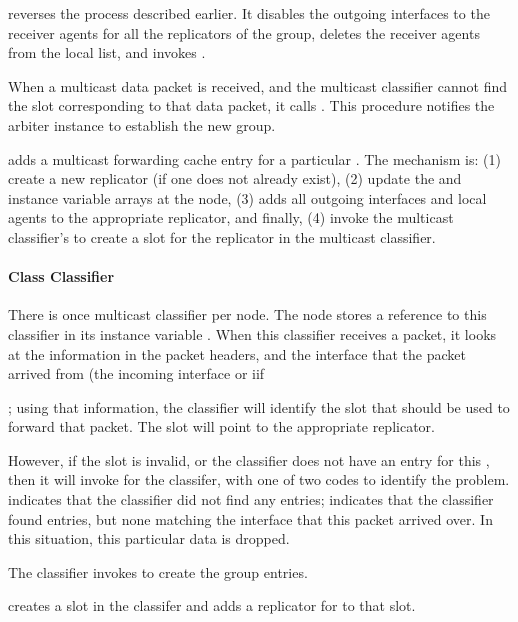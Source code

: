 { reverses the process described earlier.
It disables the outgoing interfaces to the receiver agents
for all the replicators of the group,
deletes the receiver agents from the local  list,
and invokes .

When a multicast data packet is received, and the multicast
classifier cannot find the slot corresponding to that data packet,
it calls .
This procedure notifies the arbiter instance to establish the new group.

 adds a multicast forwarding cache entry for
a particular .
The mechanism is:
(1) create a new replicator (if one does not already exist),
(2) update the  and 
 instance variable arrays at the node,
(3) adds all outgoing interfaces and local agents
to the appropriate replicator,
and finally,
(4) invoke the multicast classifier's 
 to create a slot for the replicator in the multicast classifier.

\paragraph{Class Classifier}
There is once multicast classifier per node.
The node stores a reference to this classifier in its instance variable
.
When this classifier receives a packet,
it looks at the  information in the packet headers,
and the interface that the packet arrived from (the incoming interface or iif};
using that information, the classifier will identify the slot
that should be used to forward that packet.  The slot will point
to the appropriate replicator.

However, if the slot is invalid, or the classifier does not have an
entry for this ,
then it will invoke  for the classifer,
with one of two codes to identify the problem.
 indicates that the classifier did not find any
 entries;
 indicates that the classifier found 
entries, but none matching the interface that this packet arrived over.
In this situation, this particular data is dropped.

The classifier  invokes 
to create the group entries.

 creates a slot in the classifer
and adds a replicator for  to that slot.

